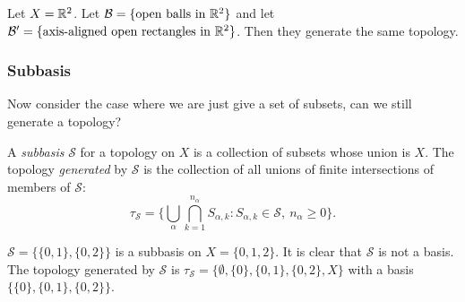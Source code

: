 \begin{example}
  Let $X=\mathbb{R}^2$. Let $\mathcal{B}=\{\text{open balls in }\mathbb{R}^2\}$ and let $\mathcal{B}'=\{\text{axis-aligned open rectangles in }\mathbb{R}^2\}$. Then they generate the same topology.
\begin{center}
\end{center}
  
\end{example}

\subsubsection{Subbasis}

Now consider the case where we are just give a set of subsets, can we still generate a topology?

\begin{definition}[Subbasis]
A \emph{subbasis} $\mathcal{S}$ for a topology on $X$ is a collection of subsets whose union is $X$. The topology \emph{generated} by $\mathcal{S}$ is the collection of all unions of finite intersections of members of $\mathcal{S}$:
\[
{\tau}_{\mathcal{S}}=\Big\{\bigcup_{\alpha} \bigcap_{k=1}^{n_\alpha} S_{\alpha,k} : S_{\alpha,k}\in\mathcal{S},\ n_\alpha\ge 0\Big\}.
\]
\end{definition}

\begin{example}
  $\mathcal{S}=\{\{0,1\},\{0,2\}\}$ is a subbasis on $X=\{0,1,2\}$. It is clear that $\mathcal{S}$ is not a basis. The topology generated by $\mathcal{S}$ is ${\tau}_{\mathcal{S}}=\{\emptyset,\{0\},\{0,1\},\{0,2\},X\}$ with a basis $\{\{0\},\{0,1\},\{0,2\}\}$.
\end{example}

